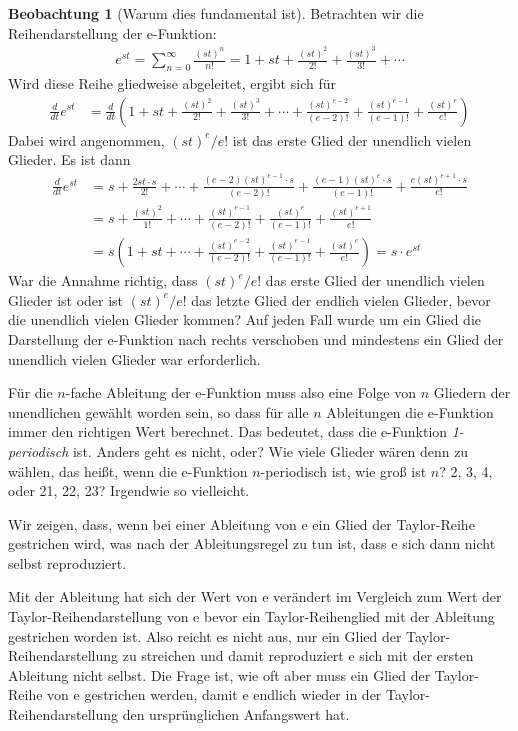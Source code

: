 ﻿\documentclass[a4paper,12pt]{report}
\theoremstyle{definition}
\newtheorem{beobachtung}{Beobachtung}
\begin{document}
	\begin{beobachtung}[Warum dies fundamental ist]
		Betrachten wir die Reihendarstellung der e-Funktion:
		\begin{align}
			e^{st} = \sum_{n=0}^{\infty} \frac{(st)^n}{n!} = 1 + st + \frac{(st)^2}{2!} + \frac{(st)^3}{3!} + \cdots
		\end{align}
		Wird diese Reihe gliedweise abgeleitet, ergibt sich für
		\begin{align}
			\frac{d}{dt} e^{st} &= \frac{d}{dt} \left(1 + st + \frac{(st)^2}{2!} + \frac{(st)^3}{3!} + \cdots + \frac{(st)^{e-2}}{(e-2)!} + \frac{(st)^{e-1}}{(e-1)!} + \frac{(st)^e}{e!}\right)
		\end{align}
		Dabei wird angenommen, $(st)^e/e!$ ist das erste Glied der unendlich vielen Glieder. Es ist dann
		\begin{align}
			\frac{d}{dt} e^{st} &= s + \frac{2st \cdot s}{2!} + \cdots + \frac{(e-2)(st)^{e-1} \cdot s}{(e-2)!} + \frac{(e-1)(st)^e \cdot s}{(e-1)!} + \frac{e(st)^{e+1} \cdot s}{e!}\\
			&= s + \frac{(st)^2}{1!} + \cdots + \frac{(st)^{e-1}}{(e-2)!} + \frac{(st)^e}{(e-1)!} + \frac{(st)^{e+1}}{e!}\\
			&= s \left(1 + st + \cdots +\frac{(st)^{e-2}}{(e-2)!} + \frac{(st)^{e-1}}{(e-1)!} + \frac{(st)^e}{e!}\right) = s \cdot e^{st}
		\end{align}
		War die Annahme richtig, dass $(st)^e/e!$ das erste Glied der unendlich vielen Glieder ist oder ist $(st)^e/e!$ das letzte Glied der endlich vielen Glieder, bevor die unendlich vielen Glieder kommen? Auf jeden Fall wurde um ein Glied die Darstellung der e-Funktion nach rechts verschoben und mindestens ein Glied der unendlich vielen Glieder war erforderlich.
		
		Für die $n$-fache Ableitung der e-Funktion muss also eine Folge von $n$ Gliedern der unendlichen gewählt worden sein, so dass für alle $n$ Ableitungen die e-Funktion immer den richtigen Wert berechnet. Das bedeutet, dass die e-Funktion \textit{1-periodisch} ist. Anders geht es nicht, oder? Wie viele Glieder wären denn zu wählen, das heißt, wenn die e-Funktion $n$-periodisch ist, wie groß ist $n$? 2, 3, 4, oder 21, 22, 23? Irgendwie so vielleicht.
		
		Wir zeigen, dass, wenn bei einer Ableitung von e ein Glied der Taylor-Reihe gestrichen wird, was nach der Ableitungsregel zu tun ist, dass e sich dann nicht selbst reproduziert.
		
		Mit der Ableitung hat sich der Wert von e verändert im Vergleich zum Wert der Taylor-Reihendarstellung von e bevor ein Taylor-Reihenglied mit der Ableitung gestrichen worden ist. Also reicht es nicht aus, nur ein Glied der Taylor-Reihendarstellung zu streichen und damit reproduziert e sich mit der ersten Ableitung nicht selbst. Die Frage ist, wie oft aber muss ein Glied der Taylor-Reihe von e gestrichen werden, damit e endlich wieder in der Taylor-Reihendarstellung den ursprünglichen Anfangswert hat.
		

\end{beobachtung}
\end{document}
